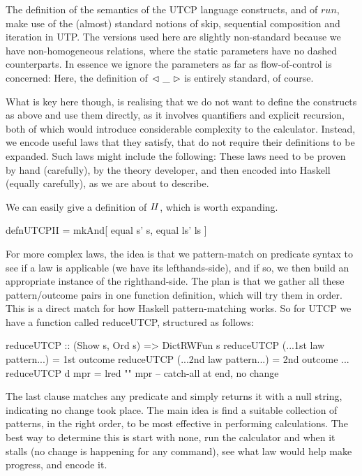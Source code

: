 The definition of the semantics of the UTCP language
constructs, and of $run$,
make use of the (almost) standard notions of skip,
sequential composition
and iteration in UTP.
The versions used here are slightly non-standard because we have
non-homogeneous relations,
where the static parameters have no dashed counterparts.
In essence we ignore the parameters as far as flow-of-control is concerned:
Here, the definition of $\mathrel{\lhd ~ {\_} ~ \rhd}$ is entirely standard, of course.

What is key here though,
is realising that we do not want to define the constructs
as above and use them directly, as it involves
quantifiers and explicit recursion,
both of which would introduce considerable complexity to the calculator.
Instead, we encode useful laws that they satisfy,
that do not require their definitions to be expanded.
Such laws might include the following:
These laws need to be proven by hand (carefully),
by the theory developer, and then encoded into Haskell
(equally carefully), as we are about to describe.

We can easily give a definition of $\mathit{II}$,
which is worth expanding.
\begin{code}
defnUTCPII = mkAnd[ equal s' s, equal ls' ls ]
\end{code}

For more complex laws,
the idea is that we pattern-match on predicate syntax
to see if a law is applicable (we have its lefthands-side),
and if so,
we then build an appropriate instance of the righthand-side.
The plan is that we gather all these pattern/outcome pairs
in one function definition,
which will try them in order.
This is a direct match for how Haskell pattern-matching works.
So for UTCP we have a function called reduceUTCP,
structured as follows:
\begin{code}
reduceUTCP :: (Show s, Ord s) => DictRWFun s
reduceUTCP (...1st law pattern...) = 1st outcome
reduceUTCP (...2nd law pattern...) = 2nd outcome
...
reduceUTCP d mpr = lred "" mpr  -- catch-all at end, no change
\end{code}
The last clause matches any predicate
and simply returns it with a null string,
indicating no change took place.
The main idea is find a suitable collection of patterns,
in the right order,
to be most effective in performing calculations.
The best way to determine this is start with none,
run the calculator and when it stalls
(no change is happening for any command),
see what law would help make progress, and encode it.

